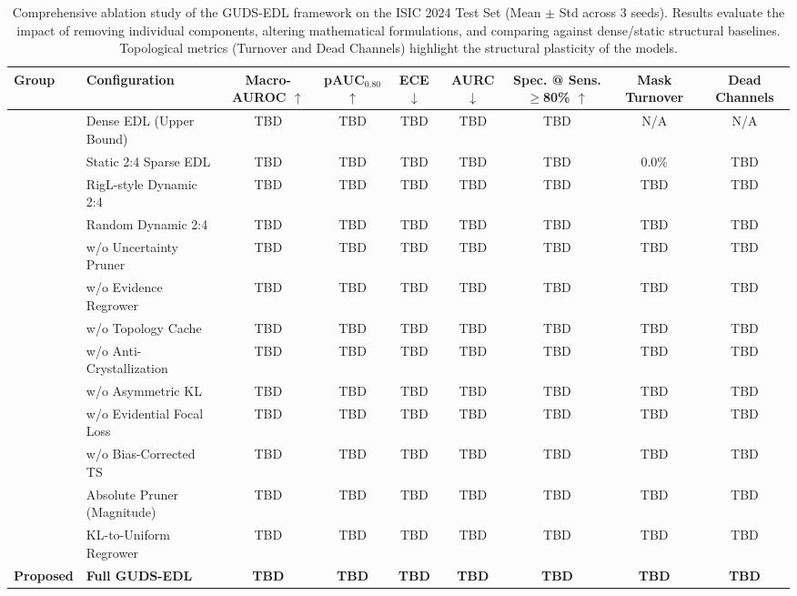 \documentclass[letterpaper]{article} %
\begin{document}
\begin{table}[!ht]
\centering
\caption{Comprehensive ablation study of the GUDS-EDL framework on the ISIC 2024 Test Set (Mean $\pm$ Std across 3 seeds). Results evaluate the impact of removing individual components, altering mathematical formulations, and comparing against dense/static structural baselines. Topological metrics (Turnover and Dead Channels) highlight the structural plasticity of the models.}
\label{tab:ablation_results}
\vspace{0.2cm}
\renewcommand{\arraystretch}{1.12}
\setlength{\tabcolsep}{2.5pt}
\begin{adjustbox}{max width=\textwidth}
\begin{tabular}{l l C C C C C C C}
\toprule
\textbf{Group} & \textbf{Configuration} & \textbf{Macro-AUROC} $\uparrow$ & \textbf{pAUC$_{0.80}$} $\uparrow$ & \textbf{ECE} $\downarrow$ & \textbf{AURC} $\downarrow$ & \textbf{Spec. @ Sens.$\ge$80\%} $\uparrow$ & \textbf{Mask Turnover} & \textbf{Dead Channels} \\
\midrule
{} 
 & Dense EDL (Upper Bound) & TBD & TBD & TBD & TBD & TBD & N/A & N/A \\
 & Static 2:4 Sparse EDL & TBD & TBD & TBD & TBD & TBD & 0.0\% & TBD \\
 & RigL-style Dynamic 2:4 & TBD & TBD & TBD & TBD & TBD & TBD & TBD \\
 & Random Dynamic 2:4 & TBD & TBD & TBD & TBD & TBD & TBD & TBD \\
\midrule
{} 
 & w/o Uncertainty Pruner & TBD & TBD & TBD & TBD & TBD & TBD & TBD \\
 & w/o Evidence Regrower & TBD & TBD & TBD & TBD & TBD & TBD & TBD \\
 & w/o Topology Cache & TBD & TBD & TBD & TBD & TBD & TBD & TBD \\
 & w/o Anti-Crystallization & TBD & TBD & TBD & TBD & TBD & TBD & TBD \\
 & w/o Asymmetric KL & TBD & TBD & TBD & TBD & TBD & TBD & TBD \\
 & w/o Evidential Focal Loss & TBD & TBD & TBD & TBD & TBD & TBD & TBD \\
 & w/o Bias-Corrected TS & TBD & TBD & TBD & TBD & TBD & TBD & TBD \\
\midrule
{} 
 & Absolute Pruner (Magnitude) & TBD & TBD & TBD & TBD & TBD & TBD & TBD \\
 & KL-to-Uniform Regrower & TBD & TBD & TBD & TBD & TBD & TBD & TBD \\
\midrule
\textbf{Proposed} & \textbf{Full GUDS-EDL} & \textbf{TBD} & \textbf{TBD} & \textbf{TBD} & \textbf{TBD} & \textbf{TBD} & \textbf{TBD} & \textbf{TBD} \\
\bottomrule
\end{tabular}
\end{adjustbox}
\end{table}
\end{document}
